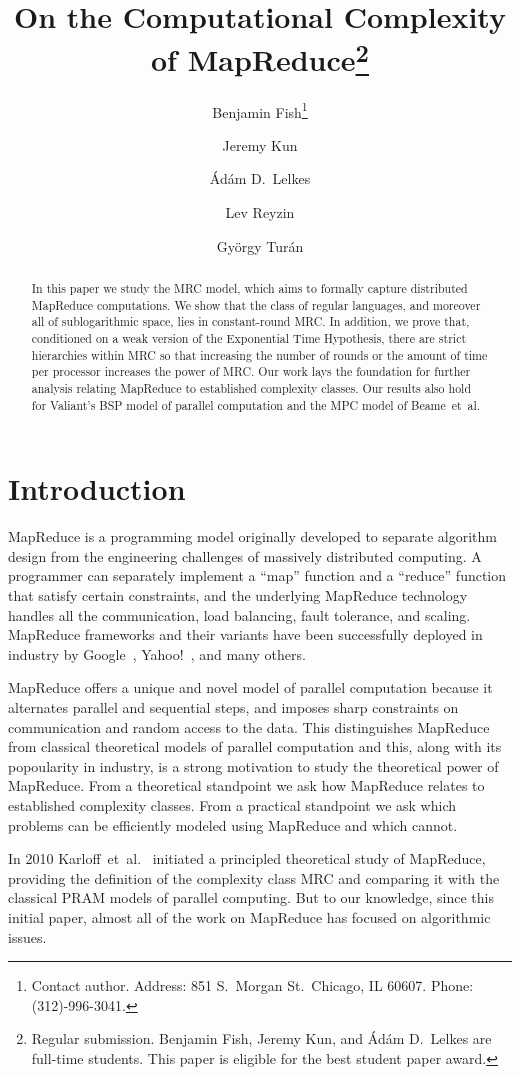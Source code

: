 \documentclass[11pt]{article}
\title{On the Computational Complexity of MapReduce\thanks{Regular submission. 
Benjamin Fish, Jeremy Kun, and \'Ad\'am D.\ Lelkes are full-time students. This paper is eligible for the best student paper award.}}
\date{}
\author{Benjamin Fish\thanks{Contact author. Address: 851 S.\ Morgan St.\ Chicago, IL 60607. Phone:  (312)-996-3041.}}
\author{Jeremy Kun}
\author{\'Ad\'am D.\ Lelkes}
\author{Lev Reyzin}
\author{Gy\"orgy Tur\'an}
\affil{
Department of Mathematics, Statistics, and Computer Science\\
University of Illinois at Chicago\\
Chicago, IL 60607\\
\texttt{\{bfish3,jkun2,alelke2,lreyzin,gyt\}@uic.edu}
}
\theoremstyle{definition}
\theoremstyle{remark}
\begin{document}
\maketitle

\begin{abstract} 

In this paper we study the MRC model, which aims to formally capture
distributed MapReduce computations.
We show that the class of regular
languages, and moreover all of sublogarithmic space, lies in constant-round
MRC.  In addition, we prove that, conditioned on a weak version of the Exponential
Time Hypothesis, there are strict hierarchies within MRC so that increasing the
number of rounds or the amount of time per processor increases the power of
MRC.  Our work lays the foundation
for further analysis relating MapReduce to established complexity classes. Our
results  also hold for Valiant's BSP model of parallel computation and the MPC model of Beame~et~al.  

\end{abstract}
\thispagestyle{empty}
\newpage
\setcounter{page}{1}
\section{Introduction}

MapReduce is a programming model originally developed to separate algorithm
design from the engineering challenges of massively distributed computing. A
programmer can separately implement a ``map'' function and a ``reduce''
function that satisfy certain constraints, and the underlying MapReduce
technology handles all the communication, load balancing, fault tolerance, and
scaling. MapReduce frameworks and their variants have been successfully
deployed in industry by Google~\cite{DeanG08}, Yahoo!~\cite{ShvachkoKRC10}, and
many others.

MapReduce offers a unique and novel model of parallel computation because it
alternates parallel and sequential steps, and imposes sharp constraints on
communication and random access to the data. This distinguishes MapReduce from
classical theoretical models of parallel computation and this, along with its
popoularity in industry, is a strong motivation to study the theoretical power
of MapReduce. From a theoretical standpoint we ask how MapReduce relates to
established complexity classes. From a practical standpoint we ask which
problems can be efficiently modeled using MapReduce and which cannot.

In 2010 Karloff~et~al.~\cite{Karloff10} initiated a principled theoretical
study of MapReduce, providing the definition of the complexity class MRC and
comparing it with the classical PRAM models of parallel computing. But to our
knowledge, since this initial paper, almost all of the work on MapReduce has
focused on algorithmic issues.
\end{document}
